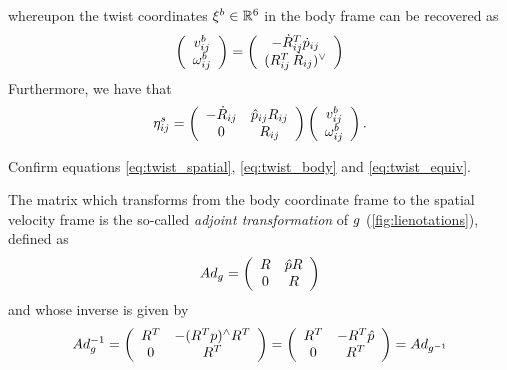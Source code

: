 %
whereupon the twist coordinates $\xi^b \in \mathbb{R}^6$ in the body frame can be recovered as 
%
\begin{align}
\left(
\begin{array}{c}
{v}_{ij}^b  \\ {\omega}_{ij}^b 
\end{array}
\right) = \left(
\begin{array}{c}
-\dot{{R}}_{ij}^T \dot{p}_{ij} \\ 	({R}_{ij}^T \, \dot{{R}}_{ij})^{\vee}
\end{array}
\right) 
\end{align}
%
Furthermore, we have that 
%
\begin{align}
	\eta_{ij}^s = 
	\left(
	\begin{array}{cc}
	-\dot{{R}}_{ij} & \hat{p}_{ij} {{R}}_{ij} \\ 	0 & {R}_{ij}
	\end{array}
	\right) 
	\left(
	\begin{array}{c}
	{v}_{ij}^b  \\ {\omega}_{ij}^b 
	\end{array}
	\right).
	\label{eq:twist_equiv}
\end{align}
%

\noindent 
\begin{homework}
	Confirm equations \eqref{eq:twist_spatial}, \eqref{eq:twist_body} and \eqref{eq:twist_equiv}.
\end{homework}


The matrix which transforms from the body coordinate frame to the spatial velocity frame is the so-called \textit{adjoint transformation} of $g$ (\cf \autoref{fig:lienotations}), defined as 
%
\begin{align}
	Ad_g  = \left(\begin{array}{cc}
	R & \hat{p} R \\
	0 & R
	\end{array}\right)
\end{align}
%
and whose inverse is given by 
%
\begin{align}
	Ad_\homo^{-1}  = \left(\begin{array}{cc}
R^T & -(R^Tp)^\wedge R^T \\
%
0 & R^T
\end{array}\right) 
%
= \left(\begin{array}{cc}
R^T & -R^T \hat{p} \\
%
0 & R^T
\end{array}\right) = Ad_{\homo^{-1}}
\end{align}

%
